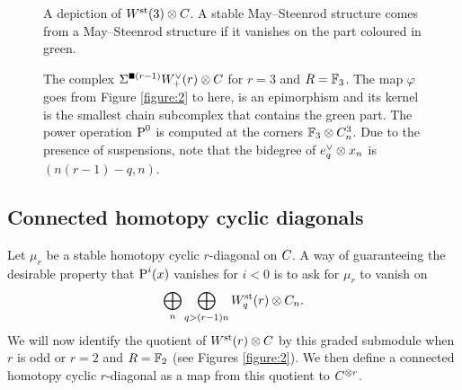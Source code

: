 \begin{figure}[b]
	
	\caption{A depiction of $\Wst(3) \ot \ucadenas$. A stable May--Steenrod structure comes from a May--Steenrod structure if it vanishes on the part coloured in green.}
	\label{figure:1}
\end{figure}

\begin{figure}
	
	\caption{If a stable homotopy $r$-cyclic comultiplication for $r=3$ vanishes on the part coloured in green, then $\power^i$ vanishes for $i<0$.}
	\label{figure:2}
	
	\vspace{1cm}
	
	
	\caption{The complex $\susp{\bs(r-1)}\Wdualaug{r} \ot \ucadenas$ for $r=3$ and $R=\bF_3$. The map $\varphi$ goes from Figure \ref{figure:2} to here, is an epimorphism and its kernel is the smallest chain subcomplex that contains the green part. The power operation $\power^0$ is computed at the corners $\bF_3\ot C^3_n$. Due to the presence of suspensions, note that the bidegree of $e_q^\dd\ot x_n$ is $ (n(r-1) - q, n)$.} 
	\label{figure:3}
\end{figure}

\subsection{Connected homotopy cyclic diagonals}\label{s:connected}

Let $\mu_r$ be a stable homotopy cyclic $r$-diagonal on $\ucadenas$.
A way of guaranteeing the desirable property that $\power^i(x)$ vanishes for $i<0$ is to ask for $\mu_r$ to vanish on
	\[
	\bigoplus_n\bigoplus_{q>(r-1)n}\Wst[q](r) \ot \ucadenas[n].
	\]
We will now identify the quotient of $\Wst(r)\otimes \ucadenas$ by this graded submodule when $r$ is odd or $r=2$ and $R=\bF_2$ (see Figures \ref{figure:2}). We then define a connected homotopy cyclic $r$-diagonal as a map from this quotient to $\ucadenas^{\otimes r}$.



